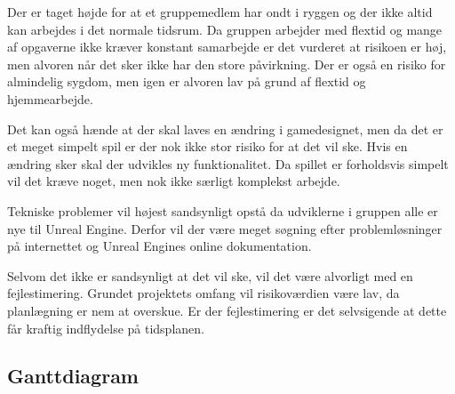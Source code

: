 Der er taget højde for at et gruppemedlem har ondt i ryggen og der ikke altid kan arbejdes i det normale tidsrum. Da gruppen arbejder med flextid og mange af opgaverne ikke kræver konstant samarbejde er det vurderet at risikoen er høj, men alvoren når det sker ikke har den store påvirkning. Der er også en risiko for almindelig sygdom, men igen er alvoren lav på grund af flextid og hjemmearbejde.

Det kan også hænde at der skal laves en ændring i gamedesignet, men da det er et meget simpelt spil er der nok ikke stor risiko for at det vil ske. Hvis en ændring sker skal der udvikles ny funktionalitet. Da spillet er forholdsvis simpelt vil det kræve noget, men nok ikke særligt komplekst arbejde.

Tekniske problemer vil højest sandsynligt opstå da udviklerne i gruppen alle er nye til Unreal Engine. Derfor vil der være meget søgning efter problemløsninger på internettet og Unreal Engines online dokumentation.

Selvom det ikke er sandsynligt at det vil ske, vil det være alvorligt med en fejlestimering. Grundet projektets omfang vil risikoværdien være lav, da planlægning er nem at overskue. Er der fejlestimering er det selvsigende at dette får kraftig indflydelse på tidsplanen.
 
\subsection{Ganttdiagram}

